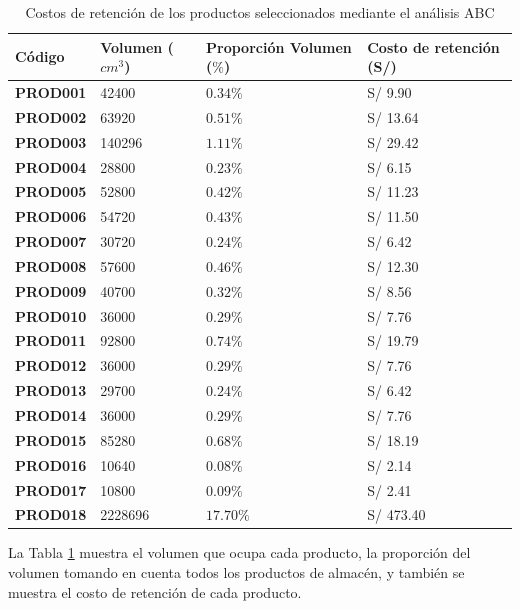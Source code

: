 \begin{table}[H]
    \caption{Costos de retención de los productos seleccionados mediante el análisis ABC}
    \begin{tabular}{p{2cm} p{2.7cm} p{4.5cm} p{4.3cm}} %
        \hline
        \textbf{Código} & \textbf{Volumen ($cm^3$)} & \textbf{Proporción Volumen ($\%$)} & \textbf{Costo de retención (S/)} \\
        \hline
        \textbf{PROD001} & 42400 & $0.34\%$ & S/ 9.90 \\
        \textbf{PROD002} & 63920 & $0.51\%$ & S/ 13.64 \\
        \textbf{PROD003} & 140296 & $1.11\%$ & S/ 29.42 \\
        \textbf{PROD004} & 28800 & $0.23\%$ & S/ 6.15 \\
        \textbf{PROD005} & 52800 & $0.42\%$ & S/ 11.23 \\
        \textbf{PROD006} & 54720 & $0.43\%$ & S/ 11.50 \\
        \textbf{PROD007} & 30720 & $0.24\%$ & S/ 6.42 \\
        \textbf{PROD008} & 57600 & $0.46\%$ & S/ 12.30 \\
        \textbf{PROD009} & 40700 & $0.32\%$ & S/ 8.56 \\
        \textbf{PROD010} & 36000 & $0.29\%$ & S/ 7.76 \\
        \textbf{PROD011} & 92800 & $0.74\%$ & S/ 19.79 \\
        \textbf{PROD012} & 36000 & $0.29\%$ & S/ 7.76 \\
        \textbf{PROD013} & 29700 & $0.24\%$ & S/ 6.42 \\
        \textbf{PROD014} & 36000 & $0.29\%$ & S/ 7.76 \\
        \textbf{PROD015} & 85280 & $0.68\%$ & S/ 18.19 \\
        \textbf{PROD016} & 10640 & $0.08\%$ & S/ 2.14 \\
        \textbf{PROD017} & 10800 & $0.09\%$ & S/ 2.41 \\
        \textbf{PROD018} & 2228696 & $17.70\%$ & S/ 473.40 \\
        \hline
    \end{tabular}
    \label{table:GrupoA_Costo_Retencion}
\end{table}

La Tabla \ref{table:GrupoA_Costo_Retencion} muestra el volumen que ocupa cada producto, la proporción del volumen tomando en cuenta todos los productos de almacén, y también se muestra el costo de retención de cada producto.
